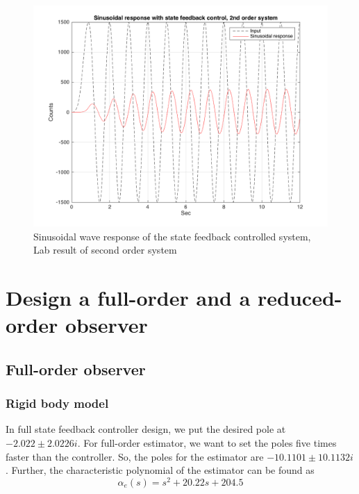 \documentclass[a4paper, 12pt]{article}
\begin{document}
\begin{figure}[!htbp]
\centering
\includegraphics[scale = 0.3]{LabSinusoidalResponseStateFeedback}
\caption{Sinusoidal wave response of the state feedback controlled system, Lab result of second order system}
\label{LabSinusoidalResponseStateFeedback}
\end{figure}


\newpage
\section{Design a full-order and a reduced-order observer}
\subsection{Full-order observer}
\subsubsection{Rigid body model}
\hspace{2.5ex}
In full state feedback controller design, we put the desired pole at $-2.022\pm 2.0226i$. For full-order estimator, we want to set the poles five times faster than the controller. So, the poles for the estimator are $-10.1101\pm 10.1132i$. Further, the characteristic polynomial of the estimator can be found as
\begin{equation}\label{EstimatorPoly}
\alpha_e(s) = s^2 + 20.22s + 204.5 
\end{equation}
\end{document}
